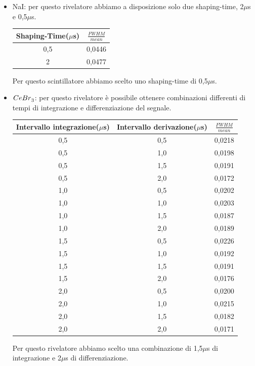 \documentclass[italian,11pt]{report}
\begin{document}
\begin{itemize}
    \item NaI: per questo rivelatore abbiamo a disposizione solo due shaping-time, 2$\mu$s e 0,5$\mu$s.

\vspace{3mm}   
    \begin{center}
   \begin{tabular}{cc}
    \hline
    Shaping-Time($\mu$s)& $\frac{FWHM}{mean}$\\
    \hline\hline
    0,5& 0,0446\\
    2& 0,0477\\
    \hline
    \end{tabular}
   \end{center}
    
    Per questo scintillatore abbiamo scelto uno shaping-time di 0,5$\mu$s.
    
 \vspace{3mm}     
    \item $\prescript{}{}{CeBr}_{3}^{}$: per questo rivelatore è possibile ottenere combinazioni differenti di tempi di integrazione e differenziazione del segnale. 
 
\vspace{3mm}  
    \begin{center}
    \centering
    \begin{tabular}{ccc}
    \hline
    Intervallo integrazione($\mu$s)& Intervallo derivazione($\mu$s)& $\frac{FWHM}{mean}$\\
    \hline\hline
    0,5& 0,5& 0,0218\\
    0,5& 1,0& 0,0198\\
    0,5& 1,5& 0,0191\\
    0,5& 2,0& 0,0172\\
    1,0& 0,5& 0,0202\\
    1,0& 1,0& 0,0203\\
    1,0& 1,5& 0,0187\\
    1,0& 2,0& 0,0189\\
    1,5& 0,5& 0,0226\\
    1,5& 1,0& 0,0192\\
    1,5& 1,5& 0,0191\\
    1,5& 2,0& 0,0176\\
    2,0& 0,5& 0,0200\\
    2,0& 1,0& 0,0215\\
    2,0& 1,5& 0,0182\\
    2,0& 2,0& 0,0171\\
    
    \hline
    \end{tabular}
    \end{center}
    
    Per questo rivelatore abbiamo scelto una combinazione di 1,5$\mu$s di integrazione e 2$\mu$s di differenziazione.
    

\end{itemize}
\end{document}
